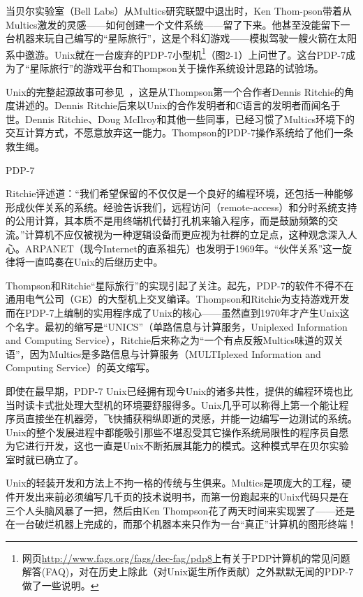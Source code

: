 \documentclass[12pt,oneside]{ctexbook}
\begin{document}
\begin{common-format}
当贝尔实验室（Bell Labs）从Multics研究联盟中退出时，Ken Thom-pson带着从Multics激发的灵感——如何创建一个文件系统——留了下来。他甚至没能留下一台机器来玩自己编写的“星际旅行”，这是个科幻游戏——模拟驾驶一艘火箭在太阳系中邀游。Unix就在一台废弃的PDP-7小型机\footnote{网页\href{http://www.fags.org/fags/dec-fag/pdp8}{http://www.fags.org/fags/dec-fag/pdp8}上有关于PDP计算机的常见问题解答(FAQ)，对在历史上除此（对Unix诞生所作贡献）之外默默无闻的PDP-7做了一些说明。}（图2-1）上问世了。这台PDP-7成为了“星际旅行”的游戏平台和Thompson关于操作系统设计思路的试验场。

Unix的完整起源故事可参见~\cite{Ritchie79}，这是从Thompson第一个合作者Dennis Ritchie的角度讲述的。Dennis Ritchie后来以Unix的合作发明者和C语言的发明者而闻名于世。Dennis Ritchie、Doug McIlroy和其他一些同事，已经习惯了Multics环境下的交互计算方式，不愿意放弃这一能力。Thompson的PDP-7操作系统给了他们一条救生绳。

\begin{fig}[2]{PDP-7}
\label{fig:PDP-7}
\end{fig}

Ritchie评述道：“我们希望保留的不仅仅是一个良好的编程环境，还包括一种能够形成伙伴关系的系统。经验告诉我们，远程访问（remote-access）和分时系统支持的公用计算，其本质不是用终端机代替打孔机来输入程序，而是鼓励频繁的交流。”计算机不应仅被视为一种逻辑设备而更应视为社群的立足点，这种观念深入人心。ARPANET（现今Internet的直系祖先）也发明于1969年。“伙伴关系”这一旋律将一直鸣奏在Unix的后继历史中。

Thompson和Ritchie“星际旅行”的实现引起了关注。起先，PDP-7的软件不得不在通用电气公司（GE）的大型机上交叉编译。Thompson和Ritchie为支持游戏开发而在PDP-7上编制的实用程序成了Unix的核心——虽然直到1970年才产生Unix这个名字。最初的缩写是“UNICS”（单路信息与计算服务，Uniplexed Information and Computing Service），Ritchie后来称之为“一个有点反叛Multics味道的双关语”，因为Multics是多路信息与计算服务（MULTIplexed Information and Computing Service）的英文缩写。

即使在最早期，PDP-7 Unix已经拥有现今Unix的诸多共性，提供的编程环境也比当时读卡式批处理大型机的环境要舒服得多。Unix几乎可以称得上第一个能让程序员直接坐在机器旁，飞快捕获稍纵即逝的灵感，并能一边编写一边测试的系统。Unix的整个发展进程中都能吸引那些不堪忍受其它操作系统局限性的程序员自愿为它进行开发，这也一直是Unix不断拓展其能力的模式。这种模式早在贝尔实验室时就已确立了。

Unix的轻装开发和方法上不拘一格的传统与生俱来。Multics是项庞大的工程，硬件开发出来前必须编写几千页的技术说明书，而第一份跑起来的Unix代码只是在三个人头脑风暴了一把，然后由Ken Thompson花了两天时间来实现罢了——还是在一台破烂机器上完成的，而那个机器本来只作为一台“真正”计算机的图形终端！


\end{common-format}
\end{document}
